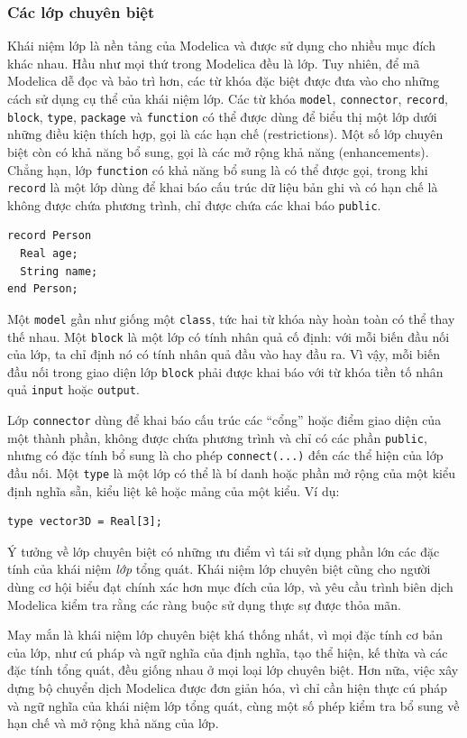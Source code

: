 \subsubsection{Các lớp chuyên biệt}
Khái niệm lớp là nền tảng của Modelica và được sử dụng cho nhiều mục đích khác nhau. Hầu như mọi thứ trong Modelica đều là lớp. Tuy nhiên, để mã Modelica dễ đọc và bảo trì hơn, các từ khóa đặc biệt được đưa vào cho những cách sử dụng cụ thể của khái niệm lớp. Các từ khóa \texttt{model}, \texttt{connector}, \texttt{record}, \texttt{block}, \texttt{type}, \texttt{package} và \texttt{function} có thể được dùng để biểu thị một lớp dưới những điều kiện thích hợp, gọi là các hạn chế (restrictions). Một số lớp chuyên biệt còn có khả năng bổ sung, gọi là các mở rộng khả năng (enhancements). Chẳng hạn, lớp \texttt{function} có khả năng bổ sung là có thể được gọi, trong khi \texttt{record} là một lớp dùng để khai báo cấu trúc dữ liệu bản ghi và có hạn chế là không được chứa phương trình, chỉ được chứa các khai báo \texttt{public}.
\begin{verbatim}
record Person
  Real age;
  String name;
end Person;
\end{verbatim}
Một \texttt{model} gần như giống một \texttt{class}, tức hai từ khóa này hoàn toàn có thể thay thế nhau. Một \texttt{block} là một lớp có tính nhân quả cố định: với mỗi biến đầu nối của lớp, ta chỉ định nó có tính nhân quả đầu vào hay đầu ra. Vì vậy, mỗi biến đầu nối trong giao diện lớp \texttt{block} phải được khai báo với từ khóa tiền tố nhân quả \texttt{input} hoặc \texttt{output}.

Lớp \texttt{connector} dùng để khai báo cấu trúc các ``cổng'' hoặc điểm giao diện của một thành phần, không được chứa phương trình và chỉ có các phần \texttt{public}, nhưng có đặc tính bổ sung là cho phép \texttt{connect(...)} đến các thể hiện của lớp đầu nối. Một \texttt{type} là một lớp có thể là bí danh hoặc phần mở rộng của một kiểu định nghĩa sẵn, kiểu liệt kê hoặc mảng của một kiểu. Ví dụ:
\begin{verbatim}
type vector3D = Real[3];
\end{verbatim}
Ý tưởng về lớp chuyên biệt có những ưu điểm vì tái sử dụng phần lớn các đặc tính của khái niệm \emph{lớp} tổng quát. Khái niệm lớp chuyên biệt cũng cho người dùng cơ hội biểu đạt chính xác hơn mục đích của lớp, và yêu cầu trình biên dịch Modelica kiểm tra rằng các ràng buộc sử dụng thực sự được thỏa mãn.

May mắn là khái niệm lớp chuyên biệt khá thống nhất, vì mọi đặc tính cơ bản của lớp, như cú pháp và ngữ nghĩa của định nghĩa, tạo thể hiện, kế thừa và các đặc tính tổng quát, đều giống nhau ở mọi loại lớp chuyên biệt. Hơn nữa, việc xây dựng bộ chuyển dịch Modelica được đơn giản hóa, vì chỉ cần hiện thực cú pháp và ngữ nghĩa của khái niệm lớp tổng quát, cùng một số phép kiểm tra bổ sung về hạn chế và mở rộng khả năng của lớp.

